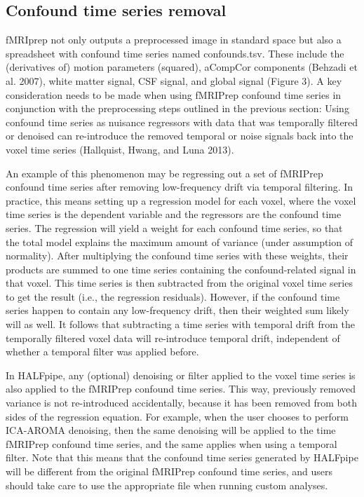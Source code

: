 \subsection{Confound time series removal}

fMRIprep not only outputs a preprocessed image in standard space but also a spreadsheet with confound time series named confounds.tsv. These include the (derivatives of) motion parameters (squared), aCompCor components (Behzadi et al. 2007), white matter signal, CSF signal, and global signal (Figure 3). A key consideration needs to be made when using fMRIPrep confound time series in conjunction with the preprocessing steps outlined in the previous section: Using confound time series as nuisance regressors with data that was temporally filtered or denoised can re-introduce the removed temporal or noise signals back into the voxel time series (Hallquist, Hwang, and Luna 2013).

An example of this phenomenon may be regressing out a set of fMRIPrep confound time series after removing low-frequency drift via temporal filtering. In practice, this means setting up a regression model for each voxel, where the voxel time series is the dependent variable and the regressors are the confound time series. The regression will yield a weight for each confound time series, so that the total model explains the maximum amount of variance (under assumption of normality). After multiplying the confound time series with these weights, their products are summed to one time series containing the confound-related signal in that voxel. This time series is then subtracted from the original voxel time series to get the result (i.e., the regression residuals). However, if the confound time series happen to contain any low-frequency drift, then their weighted sum likely will as well. It follows that subtracting a time series with temporal drift from the temporally filtered voxel data will re-introduce temporal drift, independent of whether a temporal filter was applied before.

In HALFpipe, any (optional) denoising or filter applied to the voxel time series is also applied to the fMRIPrep confound time series. This way, previously removed variance is not re-introduced accidentally, because it has been removed from both sides of the regression equation. For example, when the user chooses to perform ICA-AROMA denoising, then the same denoising will be applied to the time fMRIPrep confound time series, and the same applies when using a temporal filter. Note that this means that the confound time series generated by HALFpipe will be different from the original fMRIPrep confound time series, and users should take care to use the appropriate file when running custom analyses.
